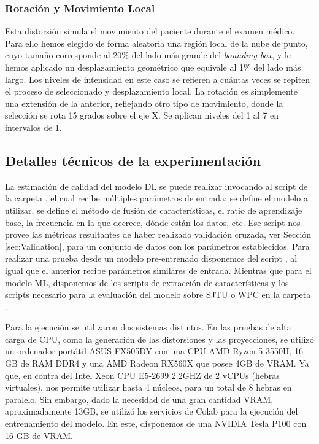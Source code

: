 \subsubsection*{Rotación y Movimiento Local}
Esta distorsión simula el movimiento del paciente durante el examen médico. 
Para ello hemos elegido de forma aleatoria una región local de la nube de punto, 
cuyo tamaño corresponde al 20\% del lado más grande del \emph{bounding box}, y 
le hemos aplicado un desplazamiento geométrico que equivale al 1\% del lado 
más largo. Los niveles de intensidad en este caso se refieren a cuántas veces 
se repiten el proceso de seleccionado y desplazamiento local. 
La rotación es simplemente una extensión de la anterior, reflejando otro tipo de movimiento, 
donde la selección se rota 15 grados sobre el eje X. Se aplican niveles del 1 al 7 en intervalos de 1.
\subsection*{Detalles técnicos de la experimentación} 
\label{sec:TrainML}
La estimación de calidad del modelo DL se puede realizar invocando al script  de la carpeta ,
el cual recibe múltiples parámetros de entrada: se define el modelo a utilizar, 
se define el método de fusión de características, el ratio de aprendizaje base,
la frecuencia en la que decrece, dónde están los datos, etc. Ese script nos 
provee las métricas resultantes de haber realizado validación cruzada, 
ver Sección \ref{sec:Validation}, 
para un conjunto de datos con los parámetros establecidos. 
Para realizar una prueba desde un modelo pre-entrenado disponemos del script 
, al igual que el anterior recibe parámetros similares de entrada.
Mientras que para el modelo ML, disponemos de los scripts de extracción 
de características y los scripts necesario para la evaluación del 
modelo sobre SJTU\cite{SJTU} o WPC\cite{WPC1, WPC2} en la carpeta .

Para la ejecución se utilizaron dos sistemas distintos. En las pruebas de alta 
carga de CPU, como la generación de las distorsiones y las proyecciones, 
se utilizó un ordenador portátil ASUS FX505DY con una CPU AMD Ryzen 5 
3550H, 16 GB de RAM DDR4 y una AMD Radeon RX560X que posee 4GB de VRAM. Ya 
que, en contra del Intel Xeon CPU E5-2699 2.2GHZ de 2 vCPUs (hebras virtuales), 
nos permite utilizar hasta 4 núcleos, para un total de 8 hebras en paralelo. 
Sin embargo, dado la necesidad de una gran cantidad VRAM, aproximadamente 13GB, 
se utilizó los servicios de Colab para la ejecución del entrenamiento del modelo. 
En este, disponemos de una NVIDIA Tesla P100 con 16 GB de VRAM.  

